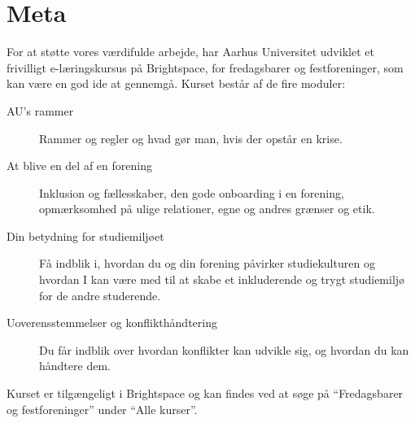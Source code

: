 \newpage
\section{Meta}
\label{sec:meta}

For at støtte vores værdifulde arbejde, har Aarhus Universitet 
udviklet et frivilligt e-læringskursus på Brightspace,
for fredagsbarer og festforeninger, som kan være en god ide at gennemgå.
Kurset består af de fire moduler:
\begin{description}
    \item[AU's rammer] Rammer og regler og hvad gør man, hvis der opstår en krise.
    \item[At blive en del af en forening] Inklusion og fællesskaber, den gode 
    onboarding i en forening, opmærksomhed på ulige relationer, egne og andres grænser og etik.
    \item[Din betydning for studiemiljøet] Få indblik i, hvordan du og din forening påvirker 
    studiekulturen og hvordan I kan være med til at skabe et inkluderende og 
    trygt studiemiljø for de andre studerende.
    \item [Uoverensstemmelser og konflikthåndtering] Du får indblik over hvordan konflikter 
    kan udvikle sig, og hvordan du kan håndtere dem.
\end{description}
Kurset er tilgængeligt i Brightspace og kan findes ved at søge 
på ``Fredagsbarer og festforeninger'' under ``Alle kurser''.

\printindex


